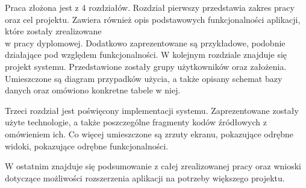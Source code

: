 \documentclass[10pt,titlepage]{article}
\begin{document}
\par Praca złożona jest z 4 rozdziałów. Rozdział pierwszy przedstawia zakres pracy oraz cel projektu. Zawiera również opis podstawowych funkcjonalności aplikacji, które zostały zrealizowane\\ w pracy dyplomowej. Dodatkowo zaprezentowane są przykładowe, podobnie działające pod względem funkcjonalności.
W kolejnym rozdziale znajduje się projekt systemu. Przedstawione zostały grupy użytkowników oraz założenia. Umieszczone są diagram przypadków użycia, a także opisany schemat bazy danych oraz omówiono konkretne tabele w niej.
\par Trzeci rozdział jest poświęcony implementacji systemu. Zaprezentowane zostały użyte technologie, a także poszczególne fragmenty kodów źródłowych z omówieniem ich. Co więcej umieszczone są zrzuty ekranu, pokazujące odrębne widoki, pokazujące odrębne funkcjonalności.
\par W ostatnim znajduje się podsumowanie z całej zrealizowanej pracy oraz wnioski dotyczące możliwości rozszerzenia aplikacji na potrzeby większego projektu.
\end{document}
